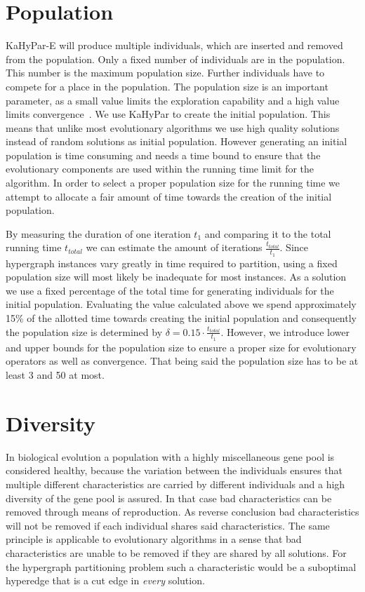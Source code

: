\documentclass[a4paper,12pt,titlepage, BCOR7mm,headsepline]{scrbook}
\numberwithin{equation}{section}
\begin{document}
\section{Population}
\label{sec:population}
KaHyPar-E will produce multiple individuals, which are inserted and removed from the population. Only a fixed number of
individuals are in the population. This number is the maximum population size. Further individuals have to compete for a place in the population. 
The population size is an important parameter, as a small value limits the exploration capability and a high value limits convergence~\cite{chen2012large}.
We use KaHyPar to create the initial population. This means that unlike most evolutionary algorithms we use high quality solutions instead of random solutions as initial population. However generating an initial population is time consuming and needs a time bound to ensure that the evolutionary components are used within the running time limit for the algorithm.
In order to select a proper population size for the running time we attempt to allocate a fair amount of time towards the creation of the initial population. 

By measuring the duration of one iteration $t_1$ and comparing it to the total running time ${t_{total}}$ we can estimate the amount of iterations $\frac{t_{total}}{t_1}$. Since hypergraph instances
vary greatly in time required to partition, using a fixed population size will most likely be inadequate for most instances. As a solution we use a fixed percentage of the total time for generating 
individuals for the initial population. Evaluating the value calculated above we spend approximately 15\% of the allotted time towards creating the initial population and consequently the population size is determined by $\delta = 0.15\cdot\frac{t_{total}}{t_1}$.
However, we introduce lower and upper bounds for the population size to ensure a proper size for evolutionary operators as well as convergence. That being said the population size has to be at least 3 and 50 at most.
\section{Diversity}
\label{sec:diversity}
In biological evolution a population with a highly miscellaneous gene pool is considered healthy, because the variation between the individuals ensures that multiple different characteristics are carried by different individuals and a high diversity of the gene pool is assured. In that case bad characteristics can be removed through means of reproduction. As reverse conclusion bad characteristics will not be removed if each individual shares said characteristics. 
The same principle is applicable to evolutionary algorithms in a sense that bad characteristics are unable to be removed if they are shared by all solutions. For the hypergraph partitioning problem such a characteristic would be a suboptimal hyperedge that is a cut edge in \emph{every} solution. 
\end{document}
